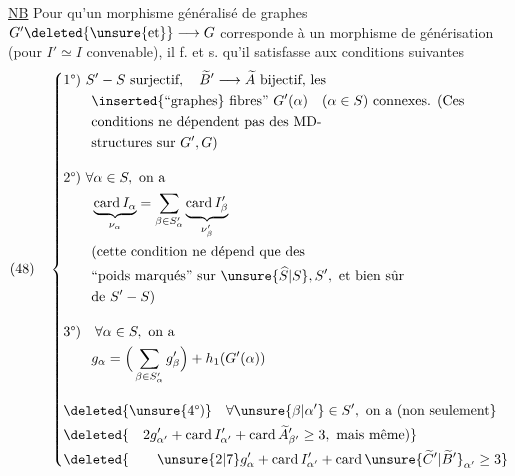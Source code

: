 \uline{NB} Pour qu'un morphisme généralisé de graphes $G'\deleted{\unsure{\text{et}}}\longrightarrow G$ corresponde à un morphisme de générisation (pour $I'\simeq I$ convenable), il f. et s. qu'il satisfasse aux conditions suivantes
\[
(48)\quad\left\{\begin{aligned}
&\text{1°) }S'-S\text{ surjectif},\quad\widetilde B'\longrightarrow\widetilde A\text{ bijectif, les}\\
&\qquad\inserted{\text{``graphes}}\text{ fibres'' }G'(\alpha)\quad(\alpha\in S)\text{ connexes. (Ces}\\
&\qquad\text{conditions ne dépendent pas des MD-}\\
&\qquad\text{structures sur }G',G\text{)}\\[1em]
&\text{2°) }\forall\alpha\in S,\text{ on a}\\
&\qquad\underbrace{\operatorname{card}I_\alpha}_{\nu_\alpha}=\sum_{\beta\in S'_\alpha}\underbrace{\operatorname{card}I'_\beta}_{\nu'_\beta}\\
&\qquad\text{(cette condition ne dépend que des}\\
&\qquad\text{``poids marqués'' sur }\unsure{\widehat S|S},S',\text{ et bien sûr}\\
&\qquad\text{de }S'-S\text{)}\\[1em]
&\text{3°)}\quad\forall\alpha\in S,\text{ on a}\\
&\qquad g_\alpha=\Big(\sum_{\beta\in S'_\alpha}g'_\beta\Big)+h_1(G'(\alpha))\\[1em]
&\deleted{\unsure{\text{4°)}}\quad\forall\unsure{\beta|\alpha'}\in S',\text{ on a (non seulement}}\\
&\deleted{\quad2g'_{\alpha'}+\operatorname{card}I'_{\alpha'}+\operatorname{card}\widetilde A'_{\beta'}\geq3,\text{ mais même)}}\\
&\deleted{\qquad\unsure{2|7}g'_{\alpha}+\operatorname{card}I'_{\alpha'}+\operatorname{card}\unsure{\widetilde C'|\widetilde B'}_{\alpha'}\geq3}
\end{aligned}\right.
\]
